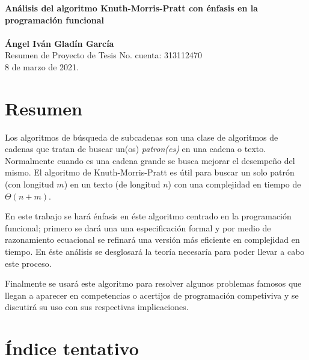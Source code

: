 \documentclass[letterpaper,10pt]{article}
\begin{document}
\noindent
\large
\textbf{Análisis del algoritmo Knuth-Morris-Pratt con énfasis en la programación funcional} \\\\
\textbf{Ángel Iván Gladín García} \\
\normalsize Resumen de Proyecto de Tesis       \hfill No. cuenta: 313112470\\
\hfill 8 de marzo de 2021.\\

\vspace*{-15pt}

\section{Resumen}
Los algoritmos de búsqueda de subcadenas son una clase de algoritmos de cadenas que tratan de
buscar un(os) \emph{patron(es)} en una cadena o texto. Normalmente cuando es una cadena grande se
busca mejorar el desempeño del mismo. El algoritmo de Knuth-Morris-Pratt es útil para buscar un
solo patrón (con longitud $m$) en un texto (de longitud $n$) con una complejidad en tiempo de
$\Theta(n + m)$.

En este trabajo se hará énfasis en éste algoritmo centrado en la programación funcional; primero se
dará una una especificación formal y por medio de razonamiento ecuacional se refinará una versión
más eficiente en complejidad en tiempo. En éste análisis se desglosará la teoría necesaría para
poder llevar a cabo este proceso.

Finalmente se usará este algoritmo para resolver algunos problemas famosos que llegan a aparecer
en competencias o acertijos de programación competiviva y se discutirá su uso con sus respectivas
implicaciones.

\section{Índice tentativo}
\end{document}
